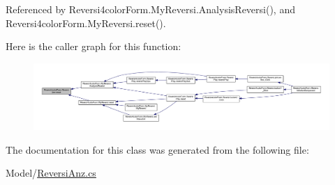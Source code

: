Referenced by Reversi4color\+Form.\+My\+Reversi.\+Analysis\+Reversi(), and Reversi4color\+Form.\+My\+Reversi.\+reset().

Here is the caller graph for this function\+:
\nopagebreak
\begin{figure}[H]
\begin{center}
\leavevmode
\includegraphics[width=350pt]{class_reversi4color_form_1_1_reversi_anz_abdb9398ace86376d2a9f1f82cf7a2113_icgraph}
\end{center}
\end{figure}


The documentation for this class was generated from the following file\+:\begin{DoxyCompactItemize}
\item 
Model/\hyperlink{_reversi_anz_8cs}{Reversi\+Anz.\+cs}\end{DoxyCompactItemize}
